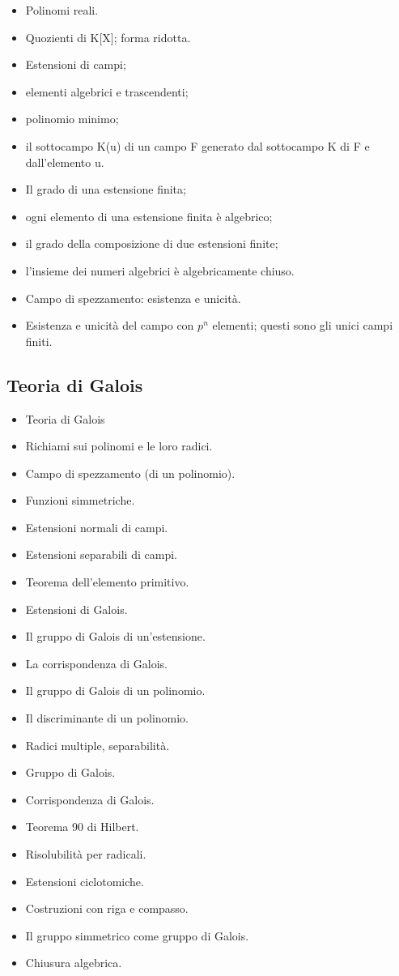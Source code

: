 \documentclass[a4paper,10pt]{article}
\begin{document}
\begin{itemize}
 \item Polinomi reali.
 \item Quozienti di K[X]; forma ridotta. 
 \item Estensioni di campi; 
 \item elementi algebrici e trascendenti;
 \item polinomio minimo; 
 \item il sottocampo K(u) di un campo F generato dal sottocampo K di F e dall'elemento u. 
 \item Il grado di una estensione finita; 
 \item ogni elemento di una estensione finita è algebrico; 
 \item il grado della composizione di due estensioni finite; 
 \item l'insieme dei numeri algebrici è algebricamente chiuso. 
 \item Campo di spezzamento: esistenza e unicità. 
 \item Esistenza e unicità del campo con $p^n$ elementi; questi sono gli unici campi finiti.
 \end{itemize}




\subsection*{Teoria di Galois}
\begin{itemize}
 \item Teoria di Galois
 \item Richiami sui polinomi e le loro radici. 
 \item Campo di spezzamento (di un polinomio). 
 \item Funzioni simmetriche.
 \item Estensioni normali di campi. 
 \item Estensioni separabili di campi. 
 \item Teorema dell'elemento primitivo. 
 \item Estensioni di Galois. 
 \item Il gruppo di Galois di un'estensione. 
 \item La corrispondenza di Galois. 
 \item Il gruppo di Galois di un polinomio. 
 \item Il discriminante di un polinomio.
 \item Radici multiple, separabilità.
 \item Gruppo di Galois. 
 \item Corrispondenza di Galois. 
 \item Teorema 90 di Hilbert.
 \item Risolubilità per radicali. 
 \item Estensioni ciclotomiche.
 \item Costruzioni con riga e compasso.
 \item Il gruppo simmetrico come gruppo di Galois.
 \item Chiusura algebrica.
\end{itemize}
\end{document}
